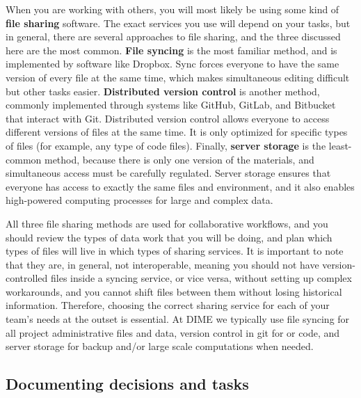 When you are working with others, you will most likely be using
some kind of \textbf{file sharing} software.
The exact services you use will depend on your tasks,
but in general, there are several approaches to file sharing,
and the three discussed here are the most common.
\textbf{File syncing} is the most familiar method,
and is implemented by software like Dropbox.
Sync forces everyone to have the same version of every file at the same time,
which makes simultaneous editing difficult but other tasks easier.
\textbf{Distributed version control} is another method,
commonly implemented through systems like GitHub, GitLab, and Bitbucket
that interact with Git.
Distributed version control allows everyone
to access different versions of files at the same time.
It is only optimized for specific types of files
(for example, any type of code files).
Finally, \textbf{server storage} is the least-common method,
because there is only one version of the materials,
and simultaneous access must be carefully regulated.
Server storage ensures that everyone has access
to exactly the same files and environment, and it also enables
high-powered computing processes for large and complex data.

All three file sharing methods are used for collaborative workflows,
and you should review the types of data work
that you will be doing, and plan which types of files
will live in which types of sharing services.
It is important to note that they are, in general, not interoperable,
meaning you should not have version-controlled files inside a syncing service,
or vice versa, without setting up complex workarounds,
and you cannot shift files between them without losing historical information.
Therefore, choosing the correct sharing service for each of your team's needs at the outset is essential.
At DIME we typically use file syncing for all project administrative files and data,
version control in git for or code,
and server storage for backup and/or large scale computations when needed.

\subsection{Documenting decisions and tasks}

